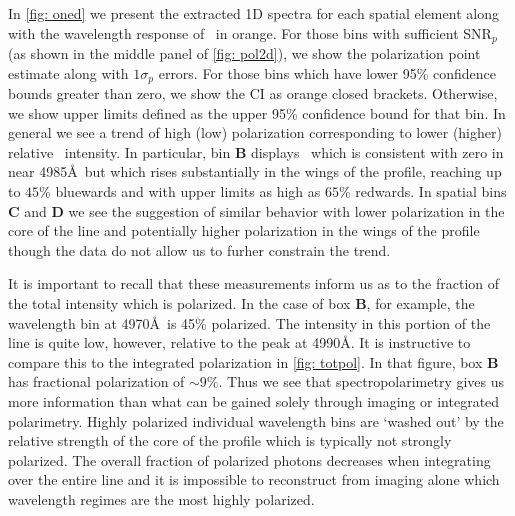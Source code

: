 In \autoref{fig: oned} we present the extracted 1D spectra for each spatial element along with the wavelength response of \pol~in orange.  For those bins with sufficient SNR$_p$ (as shown in the middle panel of \autoref{fig: pol2d}), we show the polarization point estimate along with $1 \sigma_p$ errors. For those bins which have lower 95\% confidence bounds greater than zero, we show the CI as orange closed brackets. Otherwise, we show upper limits defined as the upper 95\% confidence bound for that bin. In general we see a trend of high (low) polarization corresponding to lower (higher) relative \lya~intensity. In particular, bin \textbf{B}  displays \pol~which is consistent with zero in near 4985\AA~but which rises substantially in the wings of the profile, reaching up to $45\%$ bluewards and with upper limits as high as $65\%$ redwards.  In spatial bins \textbf{C} and \textbf{D} we see the suggestion of similar behavior with lower polarization in the core of the line and potentially higher polarization in the wings of the profile though the data do not allow us to furher constrain the trend. 

It is important to recall that these measurements inform us as to the fraction of the total intensity which is polarized. In the case of box \textbf{B}, for example, the wavelength bin at 4970\AA~is 45\% polarized. The intensity in this portion of the line is quite low, however, relative to the peak at 4990\AA. It is instructive to compare this to the integrated polarization in \autoref{fig: totpol}. In that figure, box \textbf{B} has fractional polarization of $\sim9\%$. Thus we see that spectropolarimetry gives us more information than what can be gained solely through imaging or integrated polarimetry. Highly polarized individual wavelength bins are `washed out' by the relative strength of the core of the profile which is typically not strongly polarized. The overall fraction of polarized photons decreases when integrating over the entire line and it is impossible to reconstruct from imaging alone which wavelength regimes are the most highly polarized.

